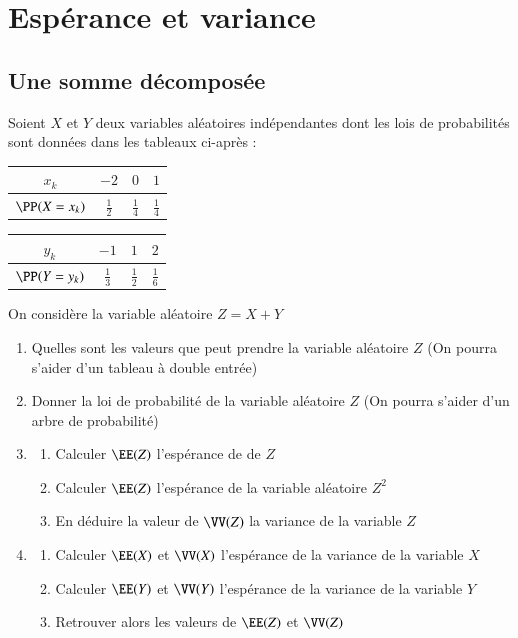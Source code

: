 \documentclass[oneside,12pt]{article}          %
\begin{document}
\section{Espérance et variance}

\subsection{Une somme décomposée}
Soient $X$ et $Y$ deux variables aléatoires indépendantes dont les lois de probabilités sont données dans les tableaux ci-après :

\begin{center}
\setlength{\tabcolsep}{10pt}
\renewcommand{\arraystretch}{1.5}
\begin{tabular}{|c|c|c|c|} \hline
    $x_k$ & $-2$ & $0$ & $1$ \\ \hline
    $\PP(X=x_k)$ & $\frac{1}{2}$ & $\frac{1}{4}$ & $\frac{1}{4}$ \\\hline
\end{tabular}
\hspace{1.5cm}
\renewcommand{\arraystretch}{1.5}
\begin{tabular}{|c|c|c|c|} \hline
    $y_k$ & $-1$ & $1$ & $2$ \\ \hline
    $\PP(Y=y_k)$ & $\frac{1}{3}$ & $\frac{1}{2}$ & $\frac{1}{6}$ \\\hline
\end{tabular}
\end{center}

On considère la variable aléatoire $Z=X+Y$
\begin{enumerate}
    \item Quelles sont les valeurs que peut prendre la variable aléatoire $Z$ (On pourra s'aider d'un tableau à double entrée)
    \item Donner la loi de probabilité de la variable aléatoire $Z$ (On pourra s'aider d'un arbre de probabilité)
    \item \begin{enumerate}
        \item Calculer $\EE(Z)$ l'espérance de de $Z$
        \item Calculer $\EE(Z)$ l'espérance de la variable aléatoire $Z^2$
        \item En déduire la valeur de $\VV(Z)$ la variance de la variable $Z$
    \end{enumerate}
    \item \begin{enumerate}
        \item Calculer $\EE(X)$ et $\VV(X)$ l'espérance de la variance de la variable $X$
        \item Calculer $\EE(Y)$ et $\VV(Y)$ l'espérance de la variance de la variable $Y$
        \item Retrouver alors les valeurs de $\EE(Z)$ et $\VV(Z)$
    \end{enumerate}
\end{enumerate}
\end{document}
